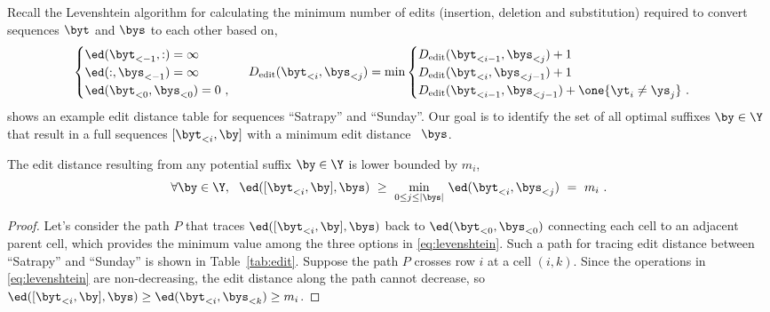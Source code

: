 Recall the Levenshtein algorithm \citep{levenshtein1966binary} for calculating the minimum number of edits (insertion, deletion and substitution) required to convert sequences $\byt$ and $\bys$ to each other based on,
\begin{equation}
\begin{cases}
    \ed(\byt_{<-1}, :) = \infty\\
    \ed(:, \bys_{<-1}) = \infty\\
    \ed(\byt_{<0},\bys_{<0}) = 0~,~
\end{cases}
    D_{\text{edit}}(\byt_{<i},\bys_{<j}) = \text{min}\begin{cases}
        D_{\text{edit}}(\byt_{<i-1},\bys_{<j}) + 1\\
        D_{\text{edit}}(\byt_{<i},\bys_{<j - 1}) + 1\\
        D_{\text{edit}}(\byt_{<i-1},\bys_{<j-1}) + \one{\yt_i \neq \ys_j}~.
    \end{cases}
\label{eq:levenshtein}
\end{equation}
 shows an example edit distance table for sequences ``Satrapy'' and ``Sunday''.
Our goal is to identify the set of all optimal suffixes $\by \in \Y$ that result in a full sequences $[\byt_{<i}, \by]$ with
a minimum edit distance \vs~$\bys$.
\begin{lemma}
\label{th:suffix}
The edit distance resulting from any potential suffix $\by \in \Y$ is lower bounded by $m_i$, %
\begin{equation}
   \forall \by \in \Y,~~ \ed([\byt_{<i}, \by], \bys) ~\ge~ \min_{0 \le j \le |\bys|} \,\ed(\byt_{<i}, \bys_{<j})
   ~=~ m_i~.
\label{eq:min-ed-bound}
\end{equation}
\vspace*{-.4cm}
\end{lemma}
\begin{proof}
Let's consider the path $P$ that traces $\ed([\byt_{<i},\by], \bys)$ back to $\ed(\byt_{<0}, \bys_{<0})$ connecting each cell to an adjacent parent cell, which provides the minimum value among the three options in \eqref{eq:levenshtein}. Such a path for tracing edit distance between ``Satrapy'' and ``Sunday'' is shown in Table~\ref{tab:edit}.  Suppose the path $P$ crosses row $i$ at a cell $(i, k)$. Since the operations in \eqref{eq:levenshtein} are non-decreasing, the edit distance along the path cannot decrease, so $\ed([\byt_{<i},\by], \bys) \geq \ed(\byt_{<i}, \bys_{<k}) \ge m_i$.
\vspace*{-.2cm}
\end{proof}

